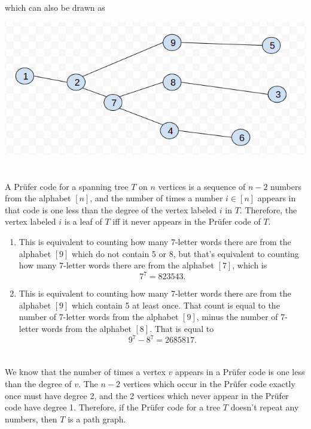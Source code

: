 \documentclass[12pt]{article}
\begin{document}
which can also be drawn as
\begin{center}
    \includegraphics[width=\textwidth]{tree_2.png}
\end{center}


\section{}
\noindent{}\bigskip\par
A Prüfer code for a spanning tree $T$ on $n$ vertices is a sequence of $n-2$ numbers from the alphabet $[n]$, and the number of times a number $i \in [n]$ appears in that code is one less than the degree of the vertex labeled $i$ in $T$. Therefore, the vertex labeled $i$ is a leaf of $T$ iff it never appears in the Prüfer code of $T$.
\begin{enumerate}
    \item This is equivalent to counting how many 7-letter words there are from the alphabet $[9]$ which do not contain 5 or 8, but that's equivalent to counting how many 7-letter words there are from the alphabet $[7]$, which is
        \[ 7^7=823543. \]
    \item This is equivalent to counting how many 7-letter words there are from the alphabet $[9]$ which contain 5 at least once. That count is equal to the number of 7-letter words from the alphabet $[9]$, minus the number of 7-letter words from the alphabet $[8]$. That is equal to
        \[ 9^7-8^7=2685817. \]
\end{enumerate}

\section{}
\noindent{}\bigskip\par
We know that the number of times a vertex $v$ appears in a Prüfer code is one less than the degree of $v$. The $n-2$ vertices which occur in the Prüfer code exactly once must have degree 2, and the 2 vertices which never appear in the Prüfer code have degree 1. Therefore, if the Prüfer code for a tree $T$ doesn't repeat any numbers, then $T$ is a path graph.
\end{document}
